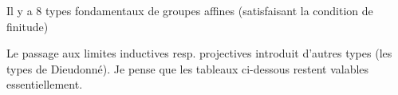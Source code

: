 Il y a 8 types fondamentaux de groupes affines (satisfaisant la condition de finitude)

Le passage aux limites inductives resp. projectives introduit d'autres types  (les types de Dieudonné). Je pense que les tableaux ci-dessous restent valables essentiellement.

\diagram{\begin{tikzcd}[ampersand replacement=\&,column sep=5em]
{}\arrow[r,leftrightarrow]\&{}
\end{tikzcd}}
